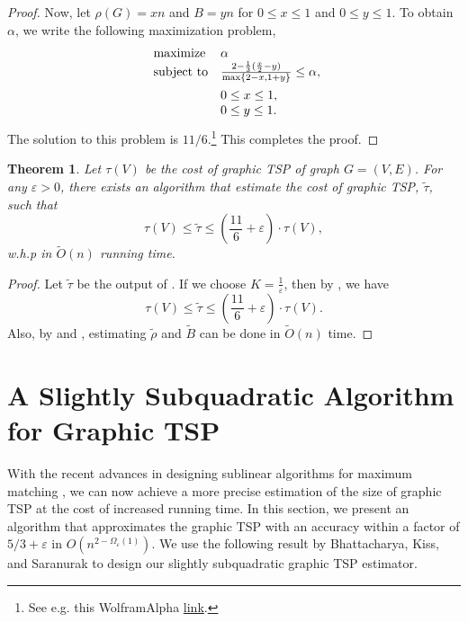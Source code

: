 \documentclass[letterpaper,11pt]{article}
\renewcommand{\epsilon}{\varepsilon}
\newcommand{\tspsize}[1]{\ensuremath{\tau}(#1)}
\newtheorem{theorem}{Theorem}[section]
\newenvironment{myproof}{
\vspace{-0.5cm}
\begin{proof}
}{
\end{proof}
}
\begin{document}
\begin{myproof}
Now, let $\rho(G) = xn$ and $B = yn$ for $0 \leq x \leq 1$ and $ 0\leq y \leq 1$. To obtain $\alpha$, we write the following maximization problem,
\begin{align*}
\begin{array}{ll@{}ll}
\text{maximize}  & \alpha \\
\vspace{5pt}\text{subject to}& \frac{2 - \frac{1}{3}(\frac{x}{2} - y)}{\max\{2-x, 1+y\}} \leq \alpha,\\
                & 0\leq x \leq 1,\\
                 & 0\leq y \leq 1.
\end{array}
\end{align*}
The solution to this problem is $11/6$.\footnote{See e.g. this WolframAlpha  \href{https://www.wolframalpha.com/input?i=Maximize\%5B\%282-1\%2F3*\%28x\%2F2+-+y\%29\%29+\%2F+Max\%5B2-x\%2C+1\%2By\%5D\%2C+\%7B0\%3C\%3D+x+\%3C\%3D1\%2C+0\%3C\%3Dy\%3C\%3D1\%7D\%2C+\%7Bx\%2Cy\%7D\%5D}{link}.} This completes the proof.
\end{myproof}


\begin{theorem}\label{thm: graphic-tsp2}
Let $\tspsize{V}$ be the cost of graphic TSP of graph $G = (V, E)$. For any $\epsilon > 0$, there exists an algorithm that estimate the cost of graphic TSP, $\tilde{\tau}$, such that
$$
\tspsize{V} \leq \tilde{\tau} \leq (\frac{11}{6} + \epsilon) \cdot \tspsize{V},
$$
w.h.p in $\tilde{O}(n)$ running time. \vspace{3pt}
\end{theorem}
\begin{myproof}
Let $\tilde{\tau}$ be the output of . If we choose $K = \frac{1}{\epsilon}$, then by , we have 
$$
\tspsize{V} \leq \tilde{\tau} \leq (\frac{11}{6} + \epsilon) \cdot \tspsize{V}.
$$
Also, by  and , estimating $\tilde{\rho}$ and $\tilde{B}$ can be done in $\tilde{O}(n)$ time.
\end{myproof}




\section{A Slightly Subquadratic Algorithm for Graphic TSP}\label{sec:graphic-TSP-slightly-sub}

With the recent advances in designing sublinear algorithms for maximum matching \cite{ behnezhadroghanirubinstein2022, BehnezhadRRS-ArXiv22, sayanSublinear2022, bhattacharya2023dynamic}, we can now achieve a more precise estimation of the size of graphic TSP at the cost of increased running time. In this section, we present an algorithm that approximates the graphic TSP with an accuracy within a factor of $5/3 + \epsilon$ in $O(n^{2-\Omega_\epsilon(1)})$. We use the following result by Bhattacharya, Kiss, and Saranurak \cite{bhattacharya2023dynamic} to design our slightly subquadratic graphic TSP estimator.
\end{document}
